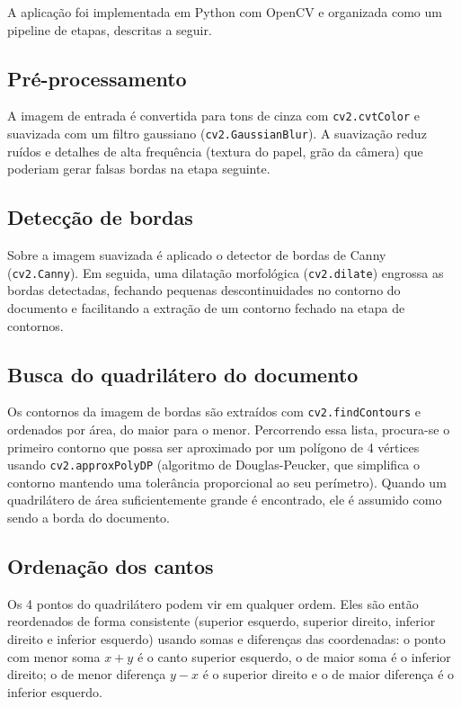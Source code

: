 \documentclass[conference]{IEEEtran}
\begin{document}
A aplicação foi implementada em Python com OpenCV e organizada como um pipeline de etapas, descritas a seguir.

\subsection{Pré-processamento}

A imagem de entrada é convertida para tons de cinza com \texttt{cv2.cvtColor} e suavizada com um filtro gaussiano (\texttt{cv2.GaussianBlur}). A suavização reduz ruídos e detalhes de alta frequência (textura do papel, grão da câmera) que poderiam gerar falsas bordas na etapa seguinte.

\subsection{Detecção de bordas}

Sobre a imagem suavizada é aplicado o detector de bordas de Canny (\texttt{cv2.Canny}). Em seguida, uma dilatação morfológica (\texttt{cv2.dilate}) engrossa as bordas detectadas, fechando pequenas descontinuidades no contorno do documento e facilitando a extração de um contorno fechado na etapa de contornos.

\subsection{Busca do quadrilátero do documento}

Os contornos da imagem de bordas são extraídos com \texttt{cv2.findContours} e ordenados por área, do maior para o menor. Percorrendo essa lista, procura-se o primeiro contorno que possa ser aproximado por um polígono de 4 vértices usando \texttt{cv2.approxPolyDP} (algoritmo de Douglas-Peucker, que simplifica o contorno mantendo uma tolerância proporcional ao seu perímetro). Quando um quadrilátero de área suficientemente grande é encontrado, ele é assumido como sendo a borda do documento.

\subsection{Ordenação dos cantos}

Os 4 pontos do quadrilátero podem vir em qualquer ordem. Eles são então reordenados de forma consistente (superior esquerdo, superior direito, inferior direito e inferior esquerdo) usando somas e diferenças das coordenadas: o ponto com menor soma $x + y$ é o canto superior esquerdo, o de maior soma é o inferior direito; o de menor diferença $y - x$ é o superior direito e o de maior diferença é o inferior esquerdo.
\end{document}
